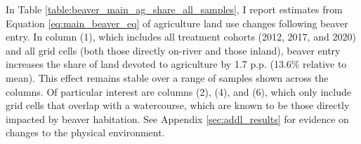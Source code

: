 In Table \ref{table:beaver_main_ag_share_all_samples}, I report estimates from Equation \ref{eq:main_beaver_eq} of agriculture land use changes following beaver entry. In column (1), which includes all treatment cohorts (2012, 2017, and 2020) and all grid cells (both those directly on-river and those inland), beaver entry increases the share of land devoted to agriculture by 1.7 p.p. (13.6\% relative to mean). This effect remains stable over a range of samples shown across the columns. Of particular interest are columns (2), (4), and (6), which only include grid cells that overlap with a watercourse, which are known to be those directly impacted by beaver habitation. See Appendix \ref{sec:addl_results} for evidence on changes to the physical environment.




